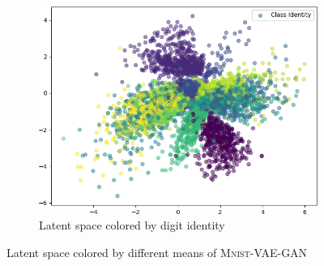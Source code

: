 \begin{figure}[H]
\begin{subfigure}{.24\textwidth}
        \includegraphics[width=\textwidth]{images/latent_spaces/mnist/vae_gan/embeddings_mu_6.png}
        \caption{Latent space colored by digit identity}
    \end{subfigure}
    \caption[\textsc{Mnist}-VAE-GAN - Latent Space]{Latent space colored by different means of \textsc{Mnist}-\ac{VAE}-\ac{GAN}}
    \label{fig:vae_gan_latent_space_mnist}
\end{figure}

